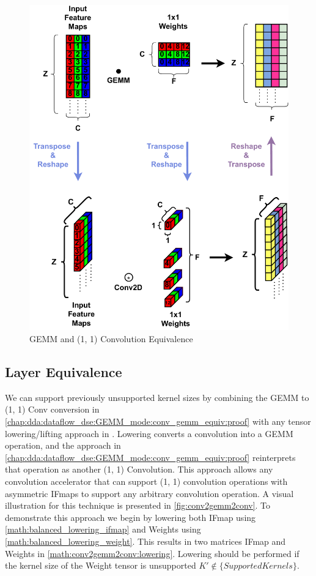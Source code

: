 \begin{figure}[]
    \centering
    \includegraphics[scale=0.5]{fig/GemmTo1x1Conv.pdf}
    \caption{\ac{GEMM} and (1, 1) Convolution Equivalence}
    \label{fig:gemmTo1x1Conv}
\end{figure}


\subsection{Layer Equivalence}
\label{chap:dda:dataflow_dse:GEMM_mode:layer_equivelence}

We can support previously unsupported kernel sizes by combining the GEMM to (1, 1)
Conv conversion in
\autoref{chap:dda:dataflow_dse:GEMM_mode:conv_gemm_equiv:proof} with any
tensor lowering/lifting approach in \cite{cafe_con_troll}. Lowering converts a
convolution into a GEMM operation, and the approach in
\autoref{chap:dda:dataflow_dse:GEMM_mode:conv_gemm_equiv:proof} reinterprets
that operation as another (1, 1) Convolution. This approach allows any convolution
accelerator that can support (1, 1) convolution operations with asymmetric IFmaps
to support any arbitrary convolution operation. A visual illustration for this
technique is presented in \autoref{fig:conv2gemm2conv}. To demonstrate this
approach we begin by lowering both IFmap using
\autoref{math:balanced_lowering_ifmap} and Weights using
\autoref{math:balanced_lowering_weight}. This results in two matrices IFmap and
Weights in \autoref{math:conv2gemm2conv:lowering}. Lowering should be performed
if the kernel size of the Weight tensor is unsupported $K' \notin
\{SupportedKernels\}$. 

